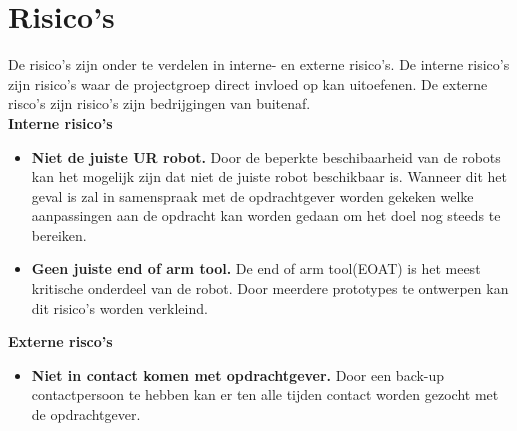
\section{Risico's}

De risico's zijn onder te verdelen in interne- en externe risico's. De interne risico's zijn risico's waar de projectgroep direct invloed op kan uitoefenen. De externe risco's zijn risico's zijn bedrijgingen van buitenaf. \\[0.5cm]

\textbf{Interne risico's}
\begin{itemize}
	\item \textbf{Niet de juiste UR robot.} Door de beperkte beschibaarheid van de robots kan het mogelijk zijn dat niet de juiste robot beschikbaar is. Wanneer dit het geval is zal in samenspraak met de opdrachtgever worden gekeken welke aanpassingen aan de opdracht kan worden gedaan om het doel nog steeds te bereiken.
	\item \textbf{Geen juiste end of arm tool.} De end of arm tool(EOAT) is het meest kritische onderdeel van de robot. Door meerdere prototypes te ontwerpen kan dit risico's worden verkleind. 
\end{itemize}

\textbf{Externe risco's}
\begin{itemize}
	\item \textbf{Niet in contact komen met opdrachtgever.} Door een back-up contactpersoon te hebben kan er ten alle tijden contact worden gezocht met de opdrachtgever.

\end{itemize}
\newpage

